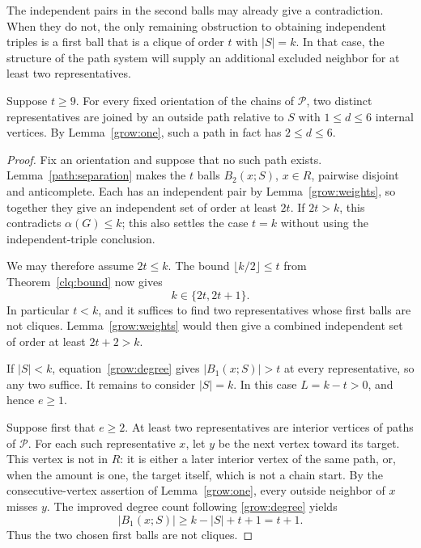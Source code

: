 The independent pairs in the second balls may already give a
contradiction.  When they do not, the only remaining obstruction to
obtaining independent triples is a first ball that is a clique of
order $t$ with $|S|=k$.  In that case, the structure of the path
system will supply an additional excluded neighbor for at least two
representatives.

\begin{lemma}\label{grow:short}
Suppose $t\ge 9$.  For every fixed orientation of the chains of
$\mathcal P$, two distinct representatives are joined by an outside
path relative to $S$ with $1\le d\le 6$ internal vertices.
By Lemma~\ref{grow:one}, such a path in fact has $2\le d\le 6$.
\end{lemma}

\begin{proof}
Fix an orientation and suppose that no such path exists.
Lemma~\ref{path:separation} makes the $t$ balls
$B_2(x;S)$, $x\in R$, pairwise disjoint and anticomplete.
Each has an independent pair by Lemma~\ref{grow:weights}, so together
they give an independent set of order at least $2t$.
If $2t>k$, this contradicts $\alpha(G)\le k$; this also settles the
case $t=k$ without using the independent-triple conclusion.

We may therefore assume $2t\le k$.  The bound
$\lfloor k/2\rfloor\le t$ from Theorem~\ref{clq:bound} now gives
\begin{equation}\label{grow:parity}
 k\in\{2t,2t+1\}.
\end{equation}
In particular $t<k$, and it suffices to find two representatives
whose first balls are not cliques.  Lemma~\ref{grow:weights} would
then give a combined independent set of order at least
$2t+2>k$.

If $|S|<k$, equation~\eqref{grow:degree} gives
$|B_1(x;S)|>t$ at every representative, so any two suffice.
It remains to consider $|S|=k$.  In this case
$L=k-t>0$, and hence $e\ge 1$.

Suppose first that $e\ge 2$.  At least two representatives are
interior vertices of paths of $\mathcal P$.  For each such
representative $x$, let $y$ be the next vertex toward its target.
This vertex is not in $R$: it is either a later interior vertex of
the same path, or, when the amount is one, the target itself, which
is not a chain start.  By the consecutive-vertex assertion of
Lemma~\ref{grow:one}, every outside neighbor of $x$ misses $y$.
The improved degree count following \eqref{grow:degree} yields
\[
 |B_1(x;S)|\ge k-|S|+t+1=t+1.
\]
Thus the two chosen first balls are not cliques.


\end{proof}
